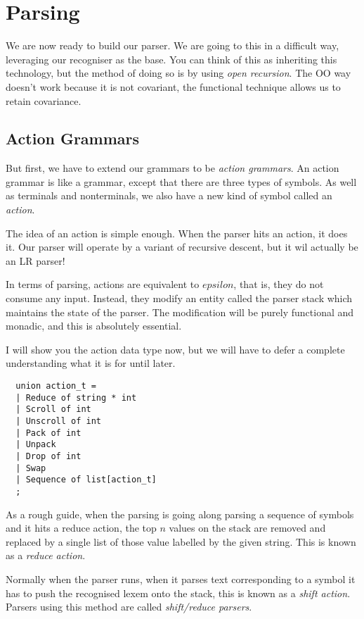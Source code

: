 \documentclass[oneside]{book}
\begin{document}
\chapter{Parsing}
We are now ready to build our parser.
We are going to this in a difficult way, leveraging
our recogniser as the base. You can think of this
as inheriting this technology, but the method of doing
so is by using {\em open recursion}. The OO way doesn't
work because it is not covariant, the functional technique
allows us to retain covariance.

\section{Action Grammars}
But first, we have to extend our grammars to be {\em action
grammars}. An action grammar is like a grammar, except that
there are three types of symbols. As well as terminals and
nonterminals, we also have a new kind of symbol called
an {\em action}.

The idea of an action is simple enough. When the parser hits
an action, it does it. Our parser will operate by a variant
of recursive descent, but it wil actually be an LR parser!

In terms of parsing, actions are equivalent to $epsilon$,
that is, they do not consume any input. Instead, they modify
an entity called the parser stack which maintains the state
of the parser. The modification will be purely functional
and monadic, and this is absolutely essential.

I will show you the action data type now, but we will have
to defer a complete understanding what it is for until later.

\begin{verbatim}
  union action_t =  
  | Reduce of string * int
  | Scroll of int
  | Unscroll of int
  | Pack of int
  | Unpack
  | Drop of int
  | Swap
  | Sequence of list[action_t]
  ;
\end{verbatim}

As a rough guide, when the parsing is going along parsing
a sequence of symbols and it hits a reduce action,
the top $n$ values on the stack are removed and replaced
by a single list of those value labelled by the given string.
This is known as a {\em reduce action}.

Normally when the parser runs, when it parses text corresponding
to a symbol it has to push the recognised lexem onto the stack,
this is known as a {\em shift action}. Parsers using this
method are called {\em shift/reduce parsers}.
\end{document}
